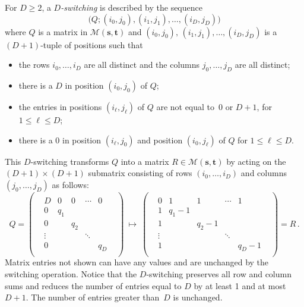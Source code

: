 \documentclass[12pt]{article}
\numberwithin{equation}{section}
\def\M{{\mathcal{M}}}
\def\({\bigl(}   \def\){\bigr)}
\def\svec{{\boldsymbol{s}}}
\def\tvec{{\boldsymbol{t}}}
\def\Mst{{\M(\svec,\tvec)}}
\begin{document}
For $D\ge 2$, a \textit{$D$-switching} is described by the sequence
\[ 
  \(Q ; (i_0,j_0),(i_1,j_1),\ldots, (i_D,j_D)\)
\]
where $Q$ is a matrix in $\Mst$
and $(i_0,j_0),\, (i_1,j_1),\ldots, (i_D,j_D)$ is a $(D{+}1)$-tuple
of positions such that
\begin{itemize}\itemsep=0pt
\item the rows $i_0,\ldots, i_D$ are all distinct and the columns
$j_0,\ldots, j_D$ are all distinct;
\item there is a $D$ in position $(i_0,j_0)$ of $Q$;
\item the entries in positions $(i_\ell,j_\ell)$ of $Q$ are 
  not equal to~0 or $D+1$, for $1\leq \ell\leq D$;
\item there is a 0 in position $(i_\ell,j_0)$ and position
$(i_0,j_\ell)$ of $Q$ for $1\leq \ell\leq D$.
\end{itemize}
This $D$-switching transforms $Q$ into a matrix 
$R\in\Mst$ by acting on the $(D{+}1)\times (D{+}1)$
submatrix consisting of rows $(i_0,\ldots, i_D)$
and columns $(j_0,\ldots, j_D)$ as follows:
\[  Q = 
      \begin{pmatrix}
           & \\[-1ex]
           & D & 0   & 0    & \cdots  & 0 & \\
           & 0 & q_1 & \\
           & 0 &     & q_2 \\
       & \vdots &     &      & \ddots \\
          &  0 &     &      &        & q_D \\[-1ex]
          & 
       \end{pmatrix}
    ~\longmapsto~
       \begin{pmatrix}
            & \\[-1ex]
           & 0 & 1       & \!1       & \cdots  & \!1 & \\
           & 1 & q_1{-}1 & \\
           & 1 &         & \!q_2{-}1 \\
      & \vdots &         &         & \ddots \\
          &  1 &         &         &        & \!q_D{-}1\\[-1ex]
          &
       \end{pmatrix}
     = R\,.
\]
Matrix entries not shown can have any values and are unchanged by
the switching operation.
Notice that the $D$-switching preserves all row and column sums and 
reduces the number of entries equal to $D$ by at least 1 and
at most $D+1$.  The number of entries greater than~$D$ is unchanged.
\end{document}
